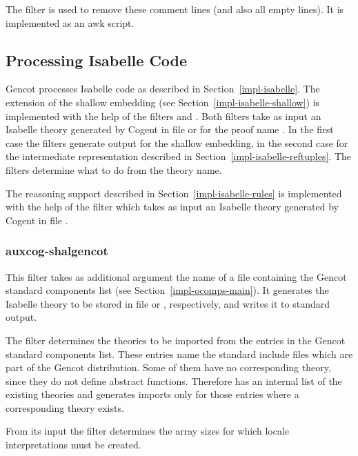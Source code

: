 The filter  is used to remove these comment lines (and also all empty lines). It is implemented
as an awk script.

\subsection{Processing Isabelle Code}
\label{impl-ocomps-isabelle}

Gencot processes Isabelle code as described in Section~\ref{impl-isabelle}. The extension of the shallow embedding
(see Section~\ref{impl-isabelle-shallow}) is implemented with the help of the filters  and
. Both filters take as input an Isabelle theory generated by Cogent in file
 or  for the proof name . In the first case
the filters generate output for the shallow embedding, in the second case for the intermediate representation
described in Section~\ref{impl-isabelle-reftuples}. The filters determine what to do from the theory name.

The reasoning support described in Section~\ref{impl-isabelle-rules} is implemented with the help of the filter
 which takes as input an Isabelle theory generated by Cogent in file
.

\subsubsection{auxcog-shalgencot}

This filter takes as additional argument the name of a file containing the Gencot standard components list (see 
Section~\ref{impl-ocomps-main}). It generates the Isabelle theory to be stored in file 
or , respectively, and writes it to standard output.

The filter determines the theories to be imported from the entries  in the Gencot standard
components list. These entries name the standard include files which are part of the Gencot distribution. Some
of them have no corresponding theory, since they do not define abstract functions. Therefore 
has an internal list of the existing theories and generates imports only for those entries where a corresponding 
theory exists.

From its input the filter determines the array sizes for which locale interpretations must be created.

